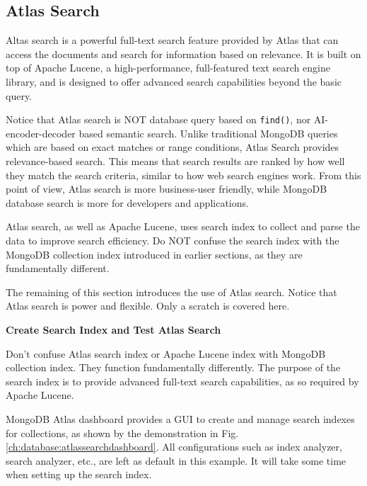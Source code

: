 \subsection{Atlas Search}

Altas search is a powerful full-text search feature provided by Atlas that can access the documents and search for information based on relevance.  It is built on top of Apache Lucene, a high-performance, full-featured text search engine library, and is designed to offer advanced search capabilities beyond the basic query. 

Notice that Atlas search is NOT database query based on \verb|find()|, nor AI-encoder-decoder based semantic search. Unlike traditional MongoDB queries which are based on exact matches or range conditions, Atlas Search provides relevance-based search. This means that search results are ranked by how well they match the search criteria, similar to how web search engines work. From this point of view, Atlas search is more business-user friendly, while MongoDB database search is more for developers and applications.

Atlas search, as well as Apache Lucene, uses search index to collect and parse the data to improve search efficiency. Do NOT confuse the search index with the MongoDB collection index introduced in earlier sections, as they are fundamentally different.

The remaining of this section introduces the use of Atlas search. Notice that Atlas search is power and flexible. Only a scratch is covered here.

\vspace{0.1in}
\noindent \textbf{Create Search Index and Test Atlas Search}
\vspace{0.1in}

Don't confuse Atlas search index or Apache Lucene index with MongoDB collection index. They function fundamentally differently. The purpose of the search index is to provide advanced full-text search capabilities, as so required by Apache Lucene.

MongoDB Atlas dashboard provides a GUI to create and manage search indexes for collections, as shown by the demonstration in Fig. \ref{ch:database:atlassearchdashboard}. All configurations such as index analyzer, search analyzer, etc., are left as default in this example. It will take some time when setting up the search index. 

